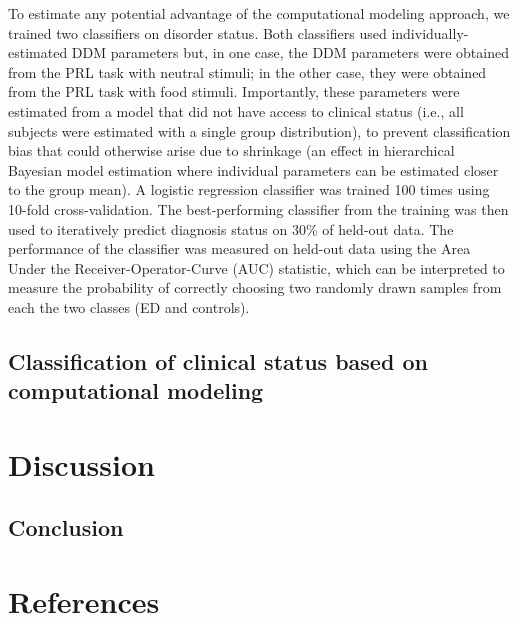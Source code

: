 \documentclass[
  man,floatsintext]{apa6}
\begin{document}
To estimate any potential advantage of the computational modeling approach, we trained two classifiers on disorder status. Both classifiers used individually-estimated DDM parameters but, in one case, the DDM parameters were obtained from the PRL task with neutral stimuli; in the other case, they were obtained from the PRL task with food stimuli. Importantly, these parameters were estimated from a model that did not have access to clinical status (i.e., all subjects were estimated with a single group distribution), to prevent classification bias that could otherwise arise due to shrinkage (an effect in hierarchical Bayesian model estimation where individual parameters can be estimated closer to the group mean). A logistic regression classifier was trained 100 times using 10-fold cross-validation. The best-performing classifier from the training was then used to iteratively predict diagnosis status on 30\% of held-out data. The performance of the classifier was measured on held-out data using the Area Under the Receiver-Operator-Curve (AUC) statistic, which can be interpreted to measure the probability of correctly choosing two randomly drawn samples from each the two classes (ED and controls).

\hypertarget{classification-of-clinical-status-based-on-computational-modeling}{%
\subsection{Classification of clinical status based on computational modeling}\label{classification-of-clinical-status-based-on-computational-modeling}}

\hypertarget{discussion}{%
\section{Discussion}\label{discussion}}

\hypertarget{conclusion}{%
\subsection{Conclusion}\label{conclusion}}

\newpage

\hypertarget{references}{%
\section{References}\label{references}}

\setlength{\parindent}{-0.5in}
\setlength{\leftskip}{0.5in}
\end{document}

